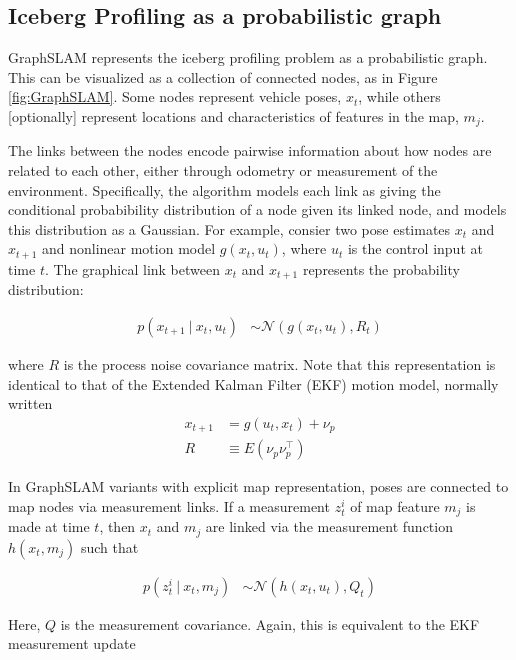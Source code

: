 \subsection{Iceberg Profiling as a probabilistic graph}

GraphSLAM represents the iceberg profiling problem as a probabilistic graph. This can be visualized as a collection of connected nodes, as in Figure \ref{fig:GraphSLAM}. Some nodes represent vehicle poses, $x_t$, while others [optionally] represent locations and characteristics of features in the map, $m_j$. 

The links between the nodes encode pairwise information about how nodes are related to each other, either through odometry or measurement of the environment. Specifically, the algorithm models each link as giving the conditional probabibility distribution of a node given its linked node, and models this distribution as a Gaussian. For example, consier two pose estimates $x_t$ and  $x_{t+1}$ and nonlinear motion model $g(x_t,u_t)$, where $u_t$ is the control input at time $t$. The graphical link between $x_t$ and  $x_{t+1}$ represents the probability distribution: 

\begin{align}
p\left(x_{t+1}~|~x_t,u_t\right) & \sim \mathcal{N}\left(g(x_t,u_t), R_t\right)
\label {eq:Gauss1}
\end{align}

where $R$ is the process noise covariance matrix. Note that this representation is identical to that of the Extended Kalman Filter (EKF) motion model, normally written 
\begin{align}
x_{t+1} &= g\left(u_t,x_t\right) + \nu_p\\
R &\equiv E\left(\nu_p \nu_p^\intercal\right) 
\end{align}

In GraphSLAM variants with explicit map representation, poses are connected to map nodes via measurement links. If a measurement $z^i_t$ of map feature $m_j$ is made at time $t$, then $x_t$ and $m_j$ are linked via the measurement function $h \left(x_t,m_j\right)$ such that 

\begin{align}
p\left(z^i_{t}~|~x_t,m_j\right) & \sim \mathcal{N}\left(h(x_t,u_t), Q_t\right)
\label {eq:Gauss2}
\end{align}

Here, $Q$ is the measurement covariance. Again, this is equivalent to the EKF measurement update

